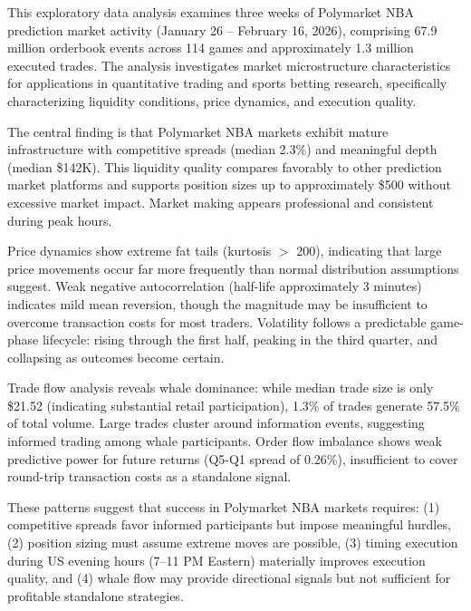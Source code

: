 \documentclass[11pt, a4paper]{report}
\begin{document}
This exploratory data analysis examines three weeks of Polymarket NBA prediction market activity (January 26 -- February 16, 2026), comprising 67.9 million orderbook events across 114 games and approximately 1.3 million executed trades. The analysis investigates market microstructure characteristics for applications in quantitative trading and sports betting research, specifically characterizing liquidity conditions, price dynamics, and execution quality.

The central finding is that Polymarket NBA markets exhibit mature infrastructure with competitive spreads (median 2.3\%) and meaningful depth (median \$142K). This liquidity quality compares favorably to other prediction market platforms and supports position sizes up to approximately \$500 without excessive market impact. Market making appears professional and consistent during peak hours.

Price dynamics show extreme fat tails (kurtosis $>$ 200), indicating that large price movements occur far more frequently than normal distribution assumptions suggest. Weak negative autocorrelation (half-life approximately 3 minutes) indicates mild mean reversion, though the magnitude may be insufficient to overcome transaction costs for most traders. Volatility follows a predictable game-phase lifecycle: rising through the first half, peaking in the third quarter, and collapsing as outcomes become certain.

Trade flow analysis reveals whale dominance: while median trade size is only \$21.52 (indicating substantial retail participation), 1.3\% of trades generate 57.5\% of total volume. Large trades cluster around information events, suggesting informed trading among whale participants. Order flow imbalance shows weak predictive power for future returns (Q5-Q1 spread of 0.26\%), insufficient to cover round-trip transaction costs as a standalone signal.

These patterns suggest that success in Polymarket NBA markets requires: (1) competitive spreads favor informed participants but impose meaningful hurdles, (2) position sizing must assume extreme moves are possible, (3) timing execution during US evening hours (7--11 PM Eastern) materially improves execution quality, and (4) whale flow may provide directional signals but not sufficient for profitable standalone strategies.

\newpage
\tableofcontents
\end{document}
